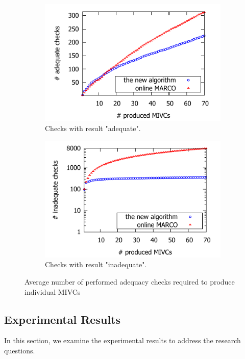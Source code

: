 \begin{figure}[!t]
\centering
\begin{subfigure}{.5\textwidth}
  \centering
  \includegraphics[scale=0.8]{./plots/adequate_checks_per_mivc_70.pdf}
  \caption{Checks with result "adequate".}
  \label{res:adequate_checks}
\end{subfigure}%
\begin{subfigure}{.5\textwidth}
  \centering
  \includegraphics[scale=0.8]{./plots/inadequate_checks_per_mivc_70.pdf}
  \caption{Checks with result "inadequate".}
  \label{res:inadequate_checks}
\end{subfigure}
\caption{Average number of performed adequacy checks required to produce individual MIVCs}
\label{res:checks}
\end{figure}

\subsection{Experimental Results}
In this section, we examine the experimental results to address the research questions.

